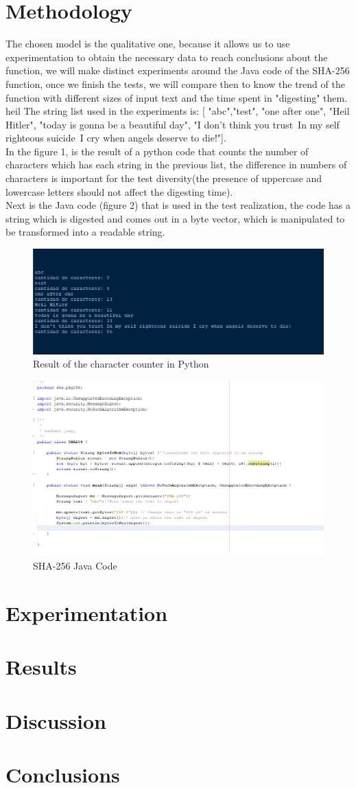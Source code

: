 \documentclass[journal]{IEEEtran}
\begin{document}
\section{Methodology}
The chosen model is the qualitative one, because it allows us to use experimentation to obtain the necessary data to reach conclusions about the function, we will make distinct experiments around the Java code of the SHA-256 function, once we finish the tests, we will compare then to know the trend of the function with different sizes of input text and the time spent in "digesting" them.\\heil 
The string list used in the experiments is:
[ "abc","test", "one after one", "Heil Hitler", "today is gonna be a beautiful day", "I don't think you trust\ In my self righteous suicide\ I cry when angels deserve to die!"].\\
In the figure 1, is the result of a python code that counts the number of characters which has each string in the previous list, the difference in numbers of characters is important for the test diversity(the presence of uppercase and lowercase letters should not affect the digesting time). \\
 Next is the Java code (figure 2) that is used in the test realization, the code has a string which is digested and comes out in a byte vector, which is manipulated to be transformed into a readable string.
\begin{figure}[h] 
	\centering \includegraphics[width=.70\columnwidth]{CantidadDeCaracteres.png}
	\caption{
		\label{fig:samplesetup}
		Result of the character counter in Python
	}
\end{figure}
\begin{figure}[h] 
	\centering \includegraphics[width=.70\columnwidth]{Sha-256Code.png}
	\caption{
		\label{fig:samplesetup}
		SHA-256 Java Code 
	}
\end{figure}
\section{Experimentation}
\section{Results}
\section{Discussion}
\section{Conclusions}
\end{document}

